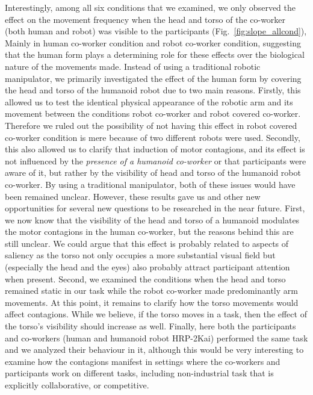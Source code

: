Interestingly, among all six conditions that we examined, we only observed the effect on the movement frequency when the head and torso of the co-worker (both human and robot) was visible to the participants (Fig.~\ref{fig:slope_allcond}), Mainly in human co-worker condition and robot co-worker condition, suggesting that the human form plays a determining role for these effects over the biological nature of the movements made. Instead of using a traditional robotic manipulator,  we primarily investigated the effect of the human form by covering the head and torso of the humanoid robot due to two main reasons. Firstly, this allowed us to test the identical physical appearance of the robotic arm and its movement between the conditions robot co-worker and robot covered co-worker. Therefore we ruled out the possibility of not having this effect in robot covered co-worker condition is mere because of two different robots were used. Secondly, this also allowed us to clarify that induction of motor contagions, and its effect is not influenced by the \textit{presence of a humanoid co-worker} or that participants were aware of it, but rather by the visibility of head and torso of the humanoid robot co-worker. By using a traditional manipulator, both of these issues would have been remained unclear. However, these results gave us and other new opportunities for several new questions to be researched in the near future. First, we now know that the visibility of the head and torso of a humanoid modulates the motor contagions in the human co-worker, but the reasons behind this are still unclear. We could argue that this effect is probably related to aspects of saliency as the torso not only occupies a more substantial visual field but (especially the head and the eyes) also probably attract participant attention when present. Second, we examined the conditions when the head and torso remained static in our task while the robot co-worker made predominantly arm movements. At this point, it remains to clarify how the torso movements would affect contagions. While we believe, if the torso moves in a task, then the effect of the torso's visibility should increase as well. Finally, here both the participants and co-workers (human and humanoid robot HRP-2Kai) performed the same task and we analyzed their behaviour in it, although this would be very interesting to examine how the contagions manifest in settings where the co-workers and participants work on different tasks, including non-industrial task that is explicitly collaborative, or competitive.


